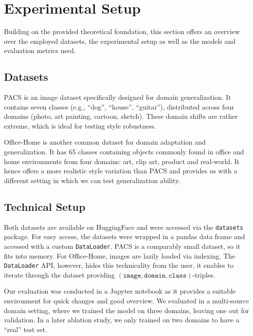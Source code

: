 \section{Experimental Setup}\label{sec:setup}

Building on the provided theoretical foundation, this section offers an overview over the employed datasets, the experimental setup as well as the models and evaluation metrics used.

\subsection{Datasets}

PACS \citep{liDeeperBroaderArtier2017} is an image dataset specifically designed for domain generalization. It contains seven classes (e.g., ``dog'', ``house'', ``guitar''), distributed across four domains (photo, art painting, cartoon, sketch). These domain shifts are rather extreme, which is ideal for testing style robustness.

Office-Home \citep{venkateswaraDeepHashingNetwork2017} is another common dataset for domain adaptation and generalization. It has 65 classes containing objects commonly found in office and home environments from four domains: art, clip art, product and real-world. It hence offers a more realistic style variation than PACS and provides us with a different setting in which we can test generalization ability.

\subsection{Technical Setup}

Both datasets are available on HuggingFace and were accessed via the \lstinline|datasets| package. For easy access, the datasets were wrapped in a pandas data frame and accessed with a custom \lstinline|DataLoader|. PACS is a comparably small dataset, so it fits into memory. For Office-Home, images are lazily loaded via indexing. The \lstinline|DataLoader| API, however, hides this technicality from the user, it enables to iterate through the dataset providing $(\mathtt{image}, \mathtt{domain}, \mathtt{class})$-triples.

Our evaluation was conducted in a Jupyter notebook as it provides a suitable environment for quick changes and good overview. We evaluated in a multi-source domain setting, where we trained the model on three domains, leaving one out for validation. In a later ablation study, we only trained on two domains to have a ``real'' test set.

